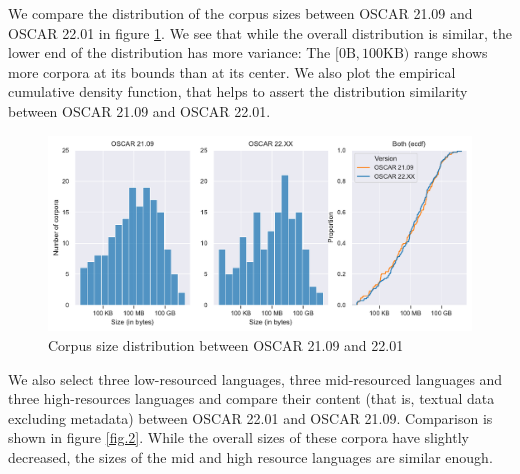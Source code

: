 We compare the distribution of the corpus sizes between OSCAR 21.09 and OSCAR 22.01 in figure \ref{fig.1}. We see that while the overall distribution is similar, the lower end of the distribution has more variance: The $[0\text{B}, 100\text{KB})$ range shows more corpora at its bounds than at its center. We also plot the empirical cumulative density function, that helps to assert the distribution similarity between OSCAR 21.09 and OSCAR 22.01.

\begin{figure}[!ht]
    \begin{center}
        \includegraphics[scale=0.7]{static/media/data/towards/size-comp}
        \caption{Corpus size distribution between OSCAR 21.09 and 22.01}
        \label{fig.1}
    \end{center}
\end{figure}

We also select three low-resourced languages, three mid-resourced languages and three high-resources languages and compare their content (that is, textual data excluding metadata) between OSCAR 22.01 and OSCAR 21.09. Comparison is shown in figure \ref{fig.2}. While the overall sizes of these corpora  have slightly decreased, the sizes of the mid and high resource languages are similar enough.

